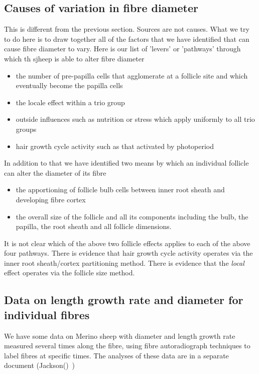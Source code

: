 \documentclass[titlepage]{article}  %
\begin{document}
\subsection{Causes of variation in fibre diameter}
This is different from the previous section. Sources are not causes. What we try to do here is to draw together all of the factors that we have identified that can cause fibre diameter to vary. Here is our list of 'levers' or 'pathways' through which th sjheep is able to alter fibre diameter
\begin{itemize}
\item the number of pre-papilla cells that agglomerate at a follicle site and which eventually become the papilla cells 
\item the {\em} locale effect within a trio group
\item outside influences such as nutrition or stress  which apply uniformly to all trio groups 
\item hair growth cycle activity such as that activated by photoperiod
\end{itemize}

In addition to that we have identified two means by which an individual follicle can alter the diameter of its fibre
\begin{itemize}
\item the apportioning of follicle bulb cells between inner root sheath and developing fibre cortex
\item the overall size of the follicle and all its components including the bulb, the papilla, the root sheath and all follicle dimensions.
\end{itemize}

It is not clear which of the above two follicle effects applies to each of the above four pathways.  There is evidence that hair growth cycle activity operates via the inner root sheath/cortex partitioning method. There is evidence that the {\em local} effect operates via the follicle size method. 

\subsection{Data on length growth rate and diameter for individual fibres}
We have some data on Merino sheep with diameter and length growth rate measured several times along the fibre, using fibre autoradiograph techniques to label fibres at specific times. The analyses of these data are in a separate document (Jackson()~\cite{})
\end{document}
